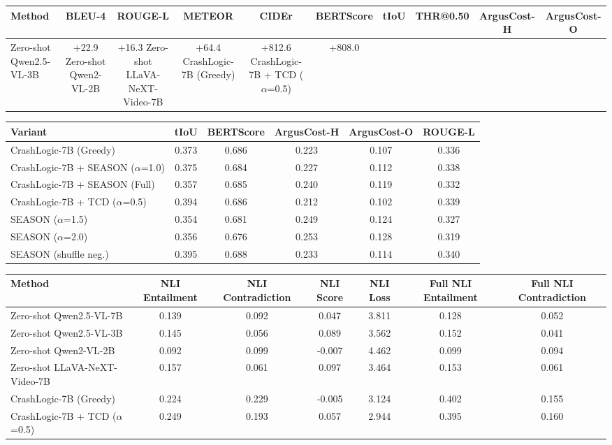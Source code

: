 \begin{tabular}{lccccccccc}
\toprule
Method & BLEU-4 & ROUGE-L & METEOR & CIDEr & BERTScore & tIoU & THR@0.50 & ArgusCost-H & ArgusCost-O \\
\midrule
Zero-shot Qwen2.5-VL-3B & +22.9%
Zero-shot Qwen2-VL-2B & +16.3%
Zero-shot LLaVA-NeXT-Video-7B & +64.4%
CrashLogic-7B (Greedy) & +812.6%
CrashLogic-7B + TCD ($\alpha$=0.5) & +808.0%
\bottomrule
\end{tabular}


\begin{tabular}{lccccc}
\toprule
Variant & tIoU & BERTScore & ArgusCost-H & ArgusCost-O & ROUGE-L \\
\midrule
CrashLogic-7B (Greedy) & 0.373 & 0.686 & 0.223 & 0.107 & 0.336 \\
CrashLogic-7B + SEASON ($\alpha$=1.0) & 0.375 & 0.684 & 0.227 & 0.112 & 0.338 \\
CrashLogic-7B + SEASON (Full) & 0.357 & 0.685 & 0.240 & 0.119 & 0.332 \\
CrashLogic-7B + TCD ($\alpha$=0.5) & 0.394 & 0.686 & 0.212 & 0.102 & 0.339 \\
SEASON ($\alpha$=1.5) & 0.354 & 0.681 & 0.249 & 0.124 & 0.327 \\
SEASON ($\alpha$=2.0) & 0.356 & 0.676 & 0.253 & 0.128 & 0.319 \\
SEASON (shuffle neg.) & 0.395 & 0.688 & 0.233 & 0.114 & 0.340 \\
\bottomrule
\end{tabular}


\begin{tabular}{lcccccc}
\toprule
Method & NLI Entailment & NLI Contradiction & NLI Score & NLI Loss & Full NLI Entailment & Full NLI Contradiction \\
\midrule
Zero-shot Qwen2.5-VL-7B & 0.139 & 0.092 & 0.047 & 3.811 & 0.128 & 0.052 \\
Zero-shot Qwen2.5-VL-3B & 0.145 & 0.056 & 0.089 & 3.562 & 0.152 & 0.041 \\
Zero-shot Qwen2-VL-2B & 0.092 & 0.099 & -0.007 & 4.462 & 0.099 & 0.094 \\
Zero-shot LLaVA-NeXT-Video-7B & 0.157 & 0.061 & 0.097 & 3.464 & 0.153 & 0.061 \\
CrashLogic-7B (Greedy) & 0.224 & 0.229 & -0.005 & 3.124 & 0.402 & 0.155 \\
CrashLogic-7B + TCD ($\alpha$=0.5) & 0.249 & 0.193 & 0.057 & 2.944 & 0.395 & 0.160 \\
\bottomrule
\end{tabular}


